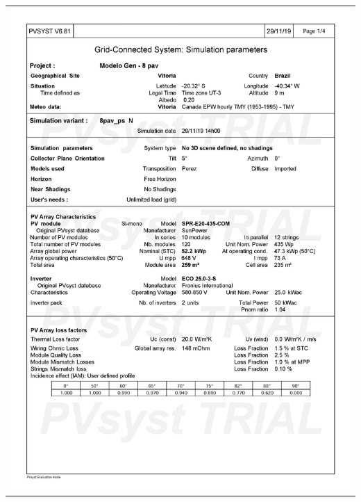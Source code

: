 \begin{table}[H]
    \centering
    \begin{tabular}{l}
        \includegraphics[width=\textwidth]{figures/attachments/resultpv17.jpg}
    \end{tabular}
\end{table}
\pagebreak
